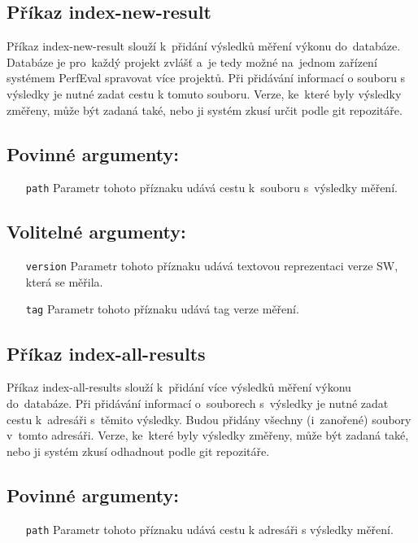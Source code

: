 \subsection{Příkaz index-new-result}

Příkaz index-new-result slouží k~přidání výsledků měření výkonu do~databáze. Databáze
je pro~každý projekt zvlášť a~je tedy možné na~jednom zařízení systémem PerfEval spravovat více projektů.
Při přidávání informací o souboru s výsledky je nutné zadat cestu k tomuto souboru.
Verze, ke~které byly výsledky změřeny, může být zadaná také, nebo ji systém zkusí určit
podle git repozitáře.

\subsection*{Povinné argumenty:}
\begin{itemize}[label=\texttt{\textbf{\textendash}}]
    \item[\texttt{path}] Parametr tohoto příznaku udává cestu k~souboru s~výsledky měření.
\end{itemize}

\subsection*{Volitelné argumenty:}
\begin{itemize}[label=\texttt{\textbf{\textendash}}]
    \item[\texttt{version}] Parametr tohoto příznaku udává textovou reprezentaci verze SW, která se měřila.
    \item[\texttt{tag}] Parametr tohoto příznaku udává tag verze měření.
\end{itemize}

\subsection{Příkaz index-all-results}

Příkaz index-all-results slouží k~přidání více výsledků měření výkonu do~databáze.
Při přidávání informací o~souborech s~výsledky je nutné zadat cestu k~adresáři s~těmito výsledky.
Budou přidány všechny (i~zanořené) soubory v~tomto adresáři.
Verze, ke~které byly výsledky změřeny, může být zadaná také, nebo ji systém zkusí odhadnout
podle git repozitáře.

\subsection*{Povinné argumenty:}
\begin{itemize}[label=\texttt{\textbf{\textendash}}]
    \item[\texttt{path}] Parametr tohoto příznaku udává cestu k adresáři s výsledky měření.
\end{itemize}

